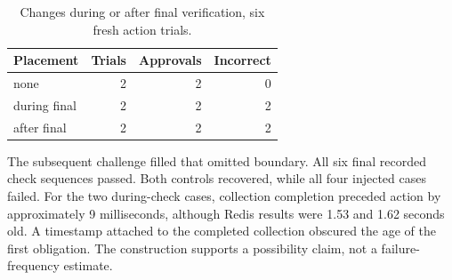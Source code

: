 \documentclass[manuscript,review,nonacm]{acmart}
\begin{document}
\begin{table}[t]
\caption{Changes during or after final verification, six fresh action trials.}
\label{tab:placement-3-4}
\centering
\begin{tabularx}{\linewidth}{@{}Xrrr@{}}
\toprule
Placement & Trials & Approvals & Incorrect \\
\midrule
none & 2 & 2 & 0 \\
during final & 2 & 2 & 2 \\
after final & 2 & 2 & 2 \\
\bottomrule
\end{tabularx}
\end{table}
The subsequent challenge filled that omitted boundary. All six final recorded check sequences passed. Both controls recovered, while all four injected cases failed. For the two during-check cases, collection completion preceded action by approximately 9 milliseconds, although Redis results were 1.53 and 1.62 seconds old. A timestamp attached to the completed collection obscured the age of the first obligation. The construction supports a possibility claim, not a failure-frequency estimate.
\end{document}
